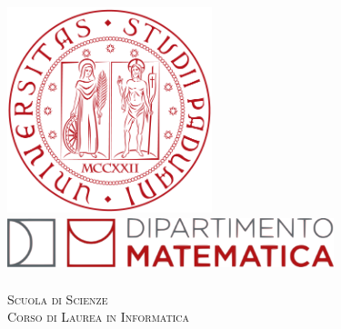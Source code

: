 \begin{titlepage}
    
    \newcommand{\HRule}{\rule{\linewidth}{0.5mm}} 
    
    \center
    
    
    
    \begin{LARGE}
        \textsc{\textbf{\myUni}}\\[1cm] 
    \end{LARGE}
    
    
    \includegraphics[height=6cm]{immagini/logo-unipd.png}\\[1cm]
    
    \includegraphics[height=1.5cm, width = 9.5cm]{immagini/MathDip.png}\\
    \textsc{\myDepartment}\\[1cm]
    
    \textsc{\Large Scuola di Scienze}\\[0.5cm] 
    
    \textsc{\large Corso di Laurea in Informatica}\\[0.5cm] 
    

\end{titlepage}
